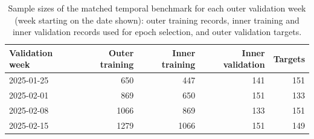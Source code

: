 \begin{table}[!htbp]\centering\small
\caption{Sample sizes of the matched temporal benchmark for each outer validation week (week starting on the date shown): outer training records, inner training and inner validation records used for epoch selection, and outer validation targets.}\label{tab:s_folds}
\begin{tabular}{@{}lrrrr@{}}\toprule
Validation week & Outer training & Inner training & Inner validation & Targets \\\midrule
2025-01-25 & 650 & 447 & 141 & 151 \\
2025-02-01 & 869 & 650 & 151 & 133 \\
2025-02-08 & 1066 & 869 & 133 & 151 \\
2025-02-15 & 1279 & 1066 & 151 & 149 \\
\bottomrule
\end{tabular}
\end{table}

